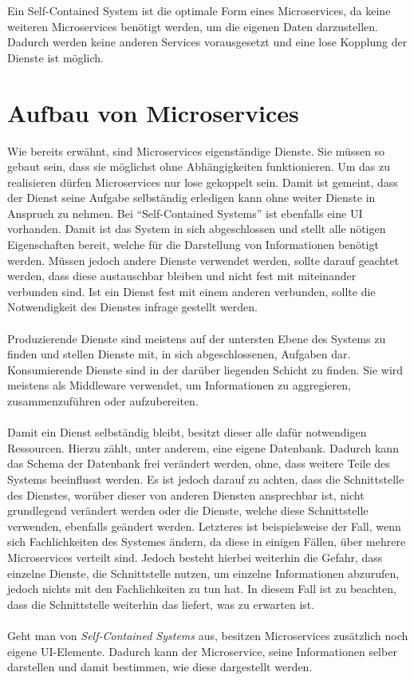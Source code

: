 Ein Self-Contained System ist die optimale Form eines Microservices, da keine weiteren Microservices benötigt werden, um die eigenen Daten darzustellen. Dadurch werden keine anderen Services vorausgesetzt und eine lose Kopplung der Dienste ist möglich.

\section{Aufbau von Microservices}
\label{sec:Aufbau}
Wie bereits erwähnt, sind Microservices eigenständige Dienste. Sie müssen so gebaut sein, dass sie möglichst ohne Abhängigkeiten funktionieren. Um das zu realisieren dürfen Microservices nur lose gekoppelt sein. Damit ist gemeint, dass der Dienst seine Aufgabe selbständig erledigen kann ohne weiter Dienste in Anspruch zu nehmen. Bei "`Self-Contained Systems"' ist ebenfalls eine UI vorhanden. Damit ist das System in sich abgeschlossen und stellt  alle nötigen Eigenschaften bereit, welche für die Darstellung von Informationen benötigt werden. Müssen jedoch andere Dienste verwendet werden, sollte darauf geachtet werden, dass diese austauschbar bleiben und nicht fest mit miteinander verbunden sind. Ist ein Dienst fest mit einem anderen verbunden, sollte die Notwendigkeit des Dienstes infrage gestellt werden.
\\\\
Produzierende Dienste sind meistens auf der untersten Ebene des Systems zu finden und stellen Dienste mit, in sich abgeschlossenen, Aufgaben dar. Konsumierende Dienste sind in der darüber liegenden Schicht zu finden. Sie wird meistens als Middleware verwendet, um Informationen zu aggregieren, zusammenzuführen oder aufzubereiten.
\\\\
Damit ein Dienst selbständig bleibt, besitzt dieser alle dafür notwendigen Ressourcen. Hierzu zählt, unter anderem, eine eigene Datenbank. Dadurch kann das Schema der Datenbank frei verändert werden, ohne, dass weitere Teile des Systems beeinflusst werden. Es ist jedoch darauf zu achten, dass die Schnittstelle des Dienstes, worüber dieser von anderen Diensten ansprechbar ist, nicht grundlegend verändert werden oder die Dienste, welche diese Schnittstelle verwenden, ebenfalls geändert werden. Letzteres ist beispielsweise der Fall, wenn sich Fachlichkeiten des Systemes ändern, da diese in einigen Fällen, über mehrere Microservices verteilt sind. Jedoch besteht hierbei weiterhin die Gefahr, dass einzelne Dienste, die Schnittstelle nutzen, um einzelne Informationen abzurufen, jedoch nichts mit den Fachlichkeiten zu tun hat. In diesem Fall ist zu beachten, dass die Schnittstelle weiterhin das liefert, was zu erwarten ist.
\\\\
Geht man von \textit{Self-Contained Systems} aus, besitzen Microservices zusätzlich noch eigene UI-Elemente. Dadurch kann der Microservice, seine Informationen selber darstellen und damit bestimmen, wie diese dargestellt werden.

